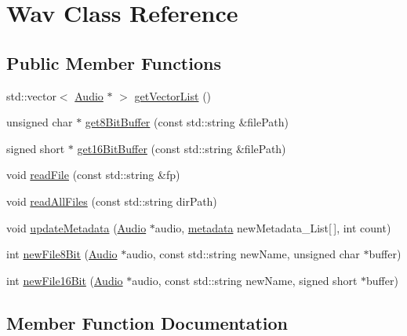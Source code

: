 \hypertarget{classWav}{}\section{Wav Class Reference}
\label{classWav}
\subsection*{Public Member Functions}
\begin{DoxyCompactItemize}
\item 
std\+::vector$<$ \hyperlink{classAudio}{Audio} $\ast$ $>$ \hyperlink{classWav_a68f79590f248a0db8f191f9e8d2d6672}{get\+Vector\+List} ()
\item 
unsigned char $\ast$ \hyperlink{classWav_a071344357789033b5afffbbbfbb5581b}{get8\+Bit\+Buffer} (const std\+::string \&file\+Path)
\item 
signed short $\ast$ \hyperlink{classWav_af1315b1ca824a7eadc2e85791004f884}{get16\+Bit\+Buffer} (const std\+::string \&file\+Path)
\item 
void \hyperlink{classWav_ae221a6a2d17ca08073ad82a017843e99}{read\+File} (const std\+::string \&fp)
\item 
void \hyperlink{classWav_a425a8f6fa3f47390617b272c353231ea}{read\+All\+Files} (const std\+::string dir\+Path)
\item 
void \hyperlink{classWav_a884d7be7c44a3f79dacf2a6f5b2e635f}{update\+Metadata} (\hyperlink{classAudio}{Audio} $\ast$audio, \hyperlink{structmetadata}{metadata} new\+Metadata\+\_\+\+List\mbox{[}$\,$\mbox{]}, int count)
\item 
int \hyperlink{classWav_a0df3872a0d777f8407de71ba71f756f4}{new\+File8\+Bit} (\hyperlink{classAudio}{Audio} $\ast$audio, const std\+::string new\+Name, unsigned char $\ast$buffer)
\item 
int \hyperlink{classWav_a4c3a3ebc811a2d4a4acd0fee974030d9}{new\+File16\+Bit} (\hyperlink{classAudio}{Audio} $\ast$audio, const std\+::string new\+Name, signed short $\ast$buffer)
\end{DoxyCompactItemize}


\subsection{Member Function Documentation}
\mbox{\label{classWav_af1315b1ca824a7eadc2e85791004f884}} 
